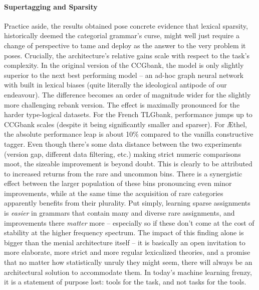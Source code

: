 \paragraph{Supertagging and Sparsity}
Practice aside, the results obtained pose concrete evidence that lexical sparsity, historically deemed the categorial grammar's curse, might well just require a change of perspective to tame and deploy as the answer to the very problem it poses.
Crucially, the architecture's relative gains scale with respect to the task's complexity.
In the original version of the CCGbank, the model is only slightly superior to the next best performing model -- an ad-hoc graph neural network with built in lexical biases (quite literally the ideological antipode of our endeavour).
The difference becomes an order of magnitude wider for the slightly more challenging rebank version.
The effect is maximally pronounced for the harder type-logical datasets.
For the French TLGbank, performance jumps up to CCGbank scales (despite it being significantly smaller and sparser).
For \AE thel, the absolute performance leap is about 10\% compared to the vanilla constructive tagger.
Even though there's some data distance between the two experiments (version gap, different data filtering, etc.) making strict numeric comparisons moot, the sizeable improvement is beyond doubt.
This is clearly to be attributed to increased returns from the rare and uncommon bins.
There is a synergistic effect between the larger population of these bins pronouncing even minor improvements, while at the same time the acquisition of rare categories apparently benefits from their plurality.
Put simply, learning sparse assignments is \textit{easier} in grammars that contain many and diverse rare assignments, and improvements there \textit{matter} more -- especially so if these don't come at the cost of stability at the higher frequency spectrum.
The impact of this finding alone is bigger than the menial architecture itself -- it is basically an open invitation to more elaborate, more strict and more regular lexicalized theories, and a promise that no matter how statistically unruly they might seem, there will always be an architectural solution to accommodate them.
In today's machine learning frenzy, it is a statement of purpose lost: tools for the task, and not tasks for the tools.

